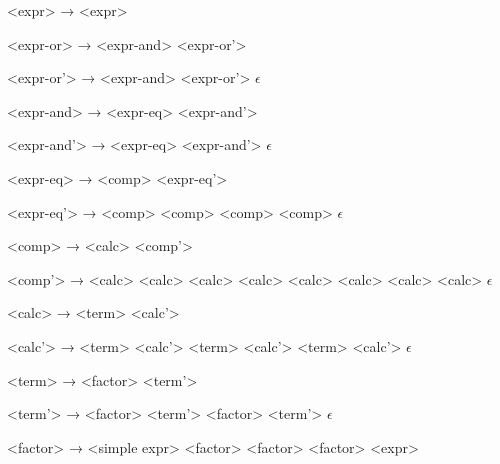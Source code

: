 <expr>           →  <expr>

<expr-or>        → <expr-and> <expr-or'>

<expr-or'>       → \lit{||} <expr-and> <expr-or'>
                 \alt $\epsilon$

<expr-and>       → <expr-eq> <expr-and'>

<expr-and'>      → \lit{\&\&} <expr-eq> <expr-and'>
                 \alt $\epsilon$

<expr-eq>        → <comp> <expr-eq'>

<expr-eq'>       → \lit{==} <comp>
                 \alt \lit{!=} <comp>
                 \alt {} <comp>
                 \alt {} <comp>
                 \alt  $\epsilon$

<comp>           → <calc> <comp'>

<comp'>          → \lit{>} <calc>
                 \alt \lit{\textless} <calc>
                 \alt \lit{>=} <calc>
                 \alt \lit{\textless=} <calc>
                 \alt {} <calc>
                 \alt {} <calc>
                 \alt {} <calc>
                 \alt {} <calc>
                 \alt $\epsilon$

<calc>           → <term> <calc'>

<calc'>          → \lit{+} <term> <calc'>
                 \alt \lit{-} <term> <calc'>
                 \alt {} <term> <calc'>
                 \alt $\epsilon$
                 
<term>           → <factor> <term'>

<term'>          → \lit{*} <factor> <term'>
                 \alt \lit{/} <factor> <term'>
                 \alt $\epsilon$

<factor>         → <simple expr>
                 \alt \lit{!} <factor>
                 \alt \lit{+} <factor>
                 \alt \lit{-} <factor>
                 \alt \lit{(} <expr> \lit{)}
